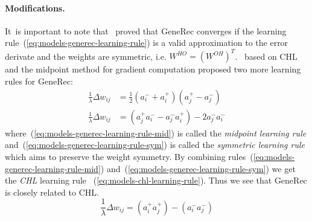\paragraph{Modifications.}
\label{sec:our-learning-rules}
\label{sec:models-generec-modifications} 
It~is important to note that~\citet{o1996bio} proved that GeneRec converges if the learning rule~(\ref{eq:models-generec-learning-rule}) is a valid approximation to the error derivate and the weights are symmetric, i.e. $W^{HO} = (W^{OH})^{T}$.~\citet{o1996bio} based on CHL and the midpoint method for gradient computation proposed two more learning rules for GeneRec:
\begin{align}
  \label{eq:models-generec-learning-rule-mid}
  \frac{1}{\lambda} \Delta w_{ij} &=  \frac{1}{2}(a^{-}_i + a^{+}_i)(a^{+}_j - a^{-}_j) \\
  \label{eq:models-generec-learning-rule-sym}
  \frac{1}{\lambda} \Delta w_{ij} &=  (a^{+}_j a^{-}_i - a^{-}_j a^{+}_i) - 2a^{-}_j a^{-}_i
\end{align}
where~(\ref{eq:models-generec-learning-rule-mid}) is called the \emph{midpoint learning rule} and~(\ref{eq:models-generec-learning-rule-sym}) is called the \emph{symmetric learning rule} which aims to preserve the weight symmetry. By combining rules~(\ref{eq:models-generec-learning-rule-mid}) and~(\ref{eq:models-generec-learning-rule-sym}) we get the \emph{CHL} learning rule ~(\ref{eq:models-chl-learning-rule}). Thus we see that GeneRec is closely related to CHL.
\begin{equation}
  \label{eq:models-generec-learning-rule-chl}
  \frac{1}{\lambda} \Delta w_{ij} = (a^{+}_i a^{+}_j) - (a^{-}_i a^{-}_j)
\end{equation} 

